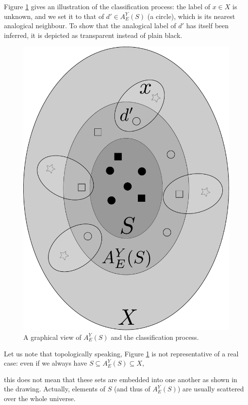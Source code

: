 {Figure \ref{extension} gives an illustration of the classification process: the
label of $x \in X$ is unknown, and we set it to that of $d' \in A_E^Y(S)$ (a
circle), which is its nearest analogical neighbour. To show that the analogical
label of $d'$ has itself been inferred, it is depicted as transparent instead of
plain black.
\begin{figure}
\caption{A graphical view of $A_E^Y(S)$ and the classification process.}
\label{extension}
\begin{center}
\includegraphics[scale=0.20]{figures/analogical_extension.pdf}
\end{center}
\end{figure}
Let us note that topologically speaking, Figure \ref{extension} is not
representative of a real case: even if we always have $S \subseteq A_E^Y(S) \subseteq X$,

this does not mean that these sets are embedded into one another as shown in
the drawing. Actually, elements of $S$ (and thus of $A_E^Y(S)$) are usually
scattered over the whole universe.

}
